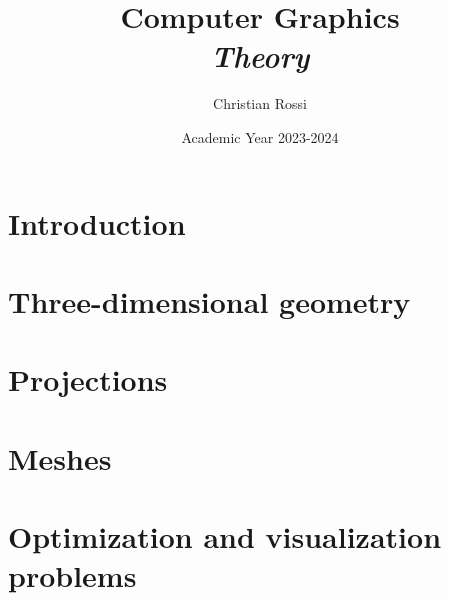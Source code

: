 \documentclass[12pt, a4paper]{report}
\title{Computer Graphics \\ \textit{Theory}}
\author{Christian Rossi}
\date{Academic Year 2023-2024}
\begin{document}
    \maketitle

    

    \cleardoublepage

    \tableofcontents

    \cleardoublepage

    \chapter{Introduction}
    
    
    

    \chapter{Three-dimensional geometry}
    
    
    
    

    \chapter{Projections}
    
    
    
    
    
    
    
    \chapter{Meshes}
    
    
    

    \chapter{Optimization and visualization problems}
    
    
    
    
    
    
\end{document}
